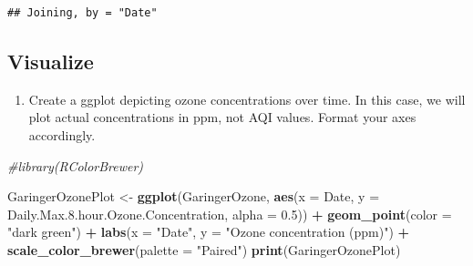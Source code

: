 \documentclass[]{article}
\newenvironment{Shaded}{\begin{snugshade}}{\end{snugshade}}
\newcommand{\CommentTok}[1]{\textcolor[rgb]{0.56,0.35,0.01}{\textit{#1}}}
\newcommand{\DataTypeTok}[1]{\textcolor[rgb]{0.13,0.29,0.53}{#1}}
\newcommand{\FloatTok}[1]{\textcolor[rgb]{0.00,0.00,0.81}{#1}}
\newcommand{\KeywordTok}[1]{\textcolor[rgb]{0.13,0.29,0.53}{\textbf{#1}}}
\newcommand{\NormalTok}[1]{#1}
\newcommand{\OperatorTok}[1]{\textcolor[rgb]{0.81,0.36,0.00}{\textbf{#1}}}
\newcommand{\StringTok}[1]{\textcolor[rgb]{0.31,0.60,0.02}{#1}}
\providecommand{\tightlist}{%
  \setlength{\itemsep}{0pt}\setlength{\parskip}{0pt}}
\begin{document}
\begin{Shaded}
\end{Shaded}

\begin{verbatim}
## Joining, by = "Date"
\end{verbatim}

\hypertarget{visualize}{%
\subsection{Visualize}\label{visualize}}

\begin{enumerate}
\def\labelenumi{\arabic{enumi}.}
\setcounter{enumi}{6}
\tightlist
\item
  Create a ggplot depicting ozone concentrations over time. In this
  case, we will plot actual concentrations in ppm, not AQI values.
  Format your axes accordingly.
\end{enumerate}

\begin{Shaded}
\begin{Highlighting}[]
\CommentTok{#library(RColorBrewer)}

\NormalTok{GaringerOzonePlot <-}\StringTok{ }
\StringTok{  }\KeywordTok{ggplot}\NormalTok{(GaringerOzone, }\KeywordTok{aes}\NormalTok{(}\DataTypeTok{x =}\NormalTok{ Date, }\DataTypeTok{y =}\NormalTok{ Daily.Max.}\FloatTok{8.}\NormalTok{hour.Ozone.Concentration, }\DataTypeTok{alpha =} \FloatTok{0.5}\NormalTok{)) }\OperatorTok{+}
\StringTok{  }\KeywordTok{geom_point}\NormalTok{(}\DataTypeTok{color =} \StringTok{"dark green"}\NormalTok{) }\OperatorTok{+}
\StringTok{  }\KeywordTok{labs}\NormalTok{(}\DataTypeTok{x =} \StringTok{"Date"}\NormalTok{, }\DataTypeTok{y =} \StringTok{"Ozone concentration (ppm)"}\NormalTok{) }\OperatorTok{+}
\StringTok{  }\KeywordTok{scale_color_brewer}\NormalTok{(}\DataTypeTok{palette =} \StringTok{"Paired"}\NormalTok{) }
\KeywordTok{print}\NormalTok{(GaringerOzonePlot)}
\end{Highlighting}
\end{Shaded}
\end{document}
